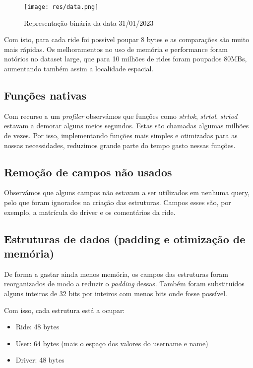 \documentclass{article}
\begin{document}
            \begin{figure}[h]
                \centering
                \texttt{[image: res/data.png]}
                \caption{Representação binária da data 31/01/2023}
            \end{figure}
            Com isto, para cada ride foi possível poupar 8 bytes e as comparações são
            muito mais rápidas. Os melhoramentos no uso de memória e performance foram
            notórios no dataset large, que para 10 milhões de rides foram poupados 80MBs,
            aumentando também assim a localidade espacial.
        \subsection{Funções nativas}
            Com recurso a um \textit{profiler} observámos que funções como \textit{strtok}, \textit{strtol},
            \textit{strtod} estavam a demorar alguns meios segundos. Estas são chamadas algumas milhões de vezes.
            Por isso, implementando funções mais simples e otimizadas para as nossas necessidades, 
            reduzimos grande parte do tempo gasto nessas funções.
        \subsection{Remoção de campos não usados}
            Observámos que alguns campos não estavam a ser utilizados em nenhuma query, 
            pelo que foram ignorados na criação das estruturas.
            Campos esses são, por exemplo, a matrícula do driver e os comentários da ride.
        \subsection{Estruturas de dados (padding e otimização de memória)}
            De forma a gastar ainda menos memória, os campos das estruturas
            foram reorganizados de modo a reduzir o \textit{padding} dessas.
            Também foram substituídos alguns inteiros de 32 bits por inteiros com menos bits
            onde fosse possível.
            
            Com isso, cada estrutura está a ocupar:
            \begin{itemize}
                \item Ride: 48 bytes
                \item User: 64 bytes (mais o espaço dos valores do username e name)
                \item Driver: 48 bytes
            \end{itemize}
  
\end{document}
